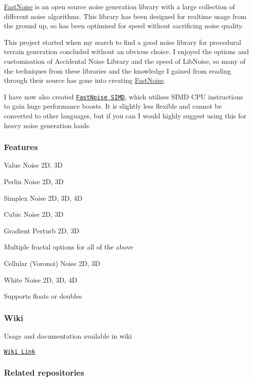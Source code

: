 \mbox{\hyperlink{class_fast_noise}{Fast\+Noise}} is an open source noise generation library with a large collection of different noise algorithms. This library has been designed for realtime usage from the ground up, so has been optimised for speed without sacrificing noise quality.

This project started when my search to find a good noise library for procedural terrain generation concluded without an obvious choice. I enjoyed the options and customisation of Accidental Noise Library and the speed of Lib\+Noise, so many of the techniques from these libraries and the knowledge I gained from reading through their source has gone into creating \mbox{\hyperlink{class_fast_noise}{Fast\+Noise}}.

I have now also created \href{https://github.com/Auburns/FastNoiseSIMD}{\tt Fast\+Noise S\+I\+MD}, which utilises S\+I\+MD C\+PU instructions to gain huge performance boosts. It is slightly less flexible and cannot be converted to other languages, but if you can I would highly suggest using this for heavy noise generation loads.

\subsubsection*{Features}


\begin{DoxyItemize}
\item Value Noise 2D, 3D
\item Perlin Noise 2D, 3D
\item Simplex Noise 2D, 3D, 4D
\item Cubic Noise 2D, 3D
\item Gradient Perturb 2D, 3D
\item Multiple fractal options for all of the above
\item Cellular (Voronoi) Noise 2D, 3D
\item White Noise 2D, 3D, 4D
\item Supports floats or doubles
\end{DoxyItemize}

\subsubsection*{Wiki}

Usage and documentation available in wiki

\href{https://github.com/Auburns/FastNoise/wiki}{\tt Wiki Link}

\subsubsection*{Related repositories}


